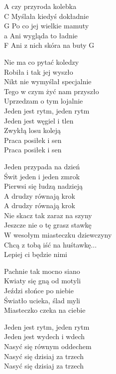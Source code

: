 \begin{text}
    A czy przyroda kolebka\\ C
    Myślała kiedyś dokładnie\\ G
    Po co jej wielkie mamuty\\ a
    Ani wygląda to ładnie\\ F
    Ani z nich skóra na buty G

    Nie ma co pytać koledzy\\
    Robiła i tak jej wyszło\\
    Nikt nie wymyślał specjalnie\\
    Tego w czym żyć nam przyszło\\
    Uprzedzam o tym lojalnie\\

    Jeden jest rytm, jeden rytm\\
    Jeden jest węgiel i tlen\\
    Zwykłą losu koleją\\
    Praca posiłek i sen\\
    Praca posiłek i sen

    Jeden przypada na dzień\\
    Świt jeden i jeden zmrok\\
    Pierwsi się łudzą nadzieją\\
    A drudzy równają krok\\
    A drudzy równają krok\\

    Nie skacz tak zaraz na szyny\\
    Jeszcze nie o tę grasz stawkę\\
    W wesołym miasteczku dziewczyny\\
    Chcą z tobą iść na huśtawkę...\\
    Lepiej ci będzie nimi

    Pachnie tak mocno siano\\
    Kwiaty się gną od motyli\\
    Jeździ słońce po niebie\\
    Światło ucieka, ślad myli\\
    Miasteczko czeka na ciebie

    Jeden jest rytm, jeden rytm\\
    Jeden jest wydech i wdech\\
    Nasyć się równym oddechem\\
    Nasyć się dzisiaj za trzech\\
    Nasyć się dzisiaj za trzech


\end{text}
